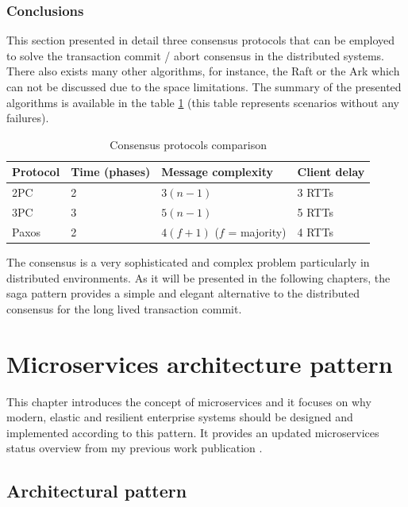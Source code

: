 \documentclass[oneside,
  digital, %
  table,   %
  nolof,     %
  nolot,     %
]{fithesis3}
\begin{document}
\subsection{Conclusions}

This section presented in detail three consensus protocols that can be employed to solve the transaction commit / abort consensus in the distributed systems. There also exists many other algorithms, for instance, the Raft or the Ark which can not be discussed due to the space limitations. The summary of the presented algorithms is available in the table \ref{tab:consensus-protocols-comparison} (this table represents scenarios without any failures).

\begin{table}
    \begin{tabularx}{\textwidth}{lllX}
        \toprule
        Protocol & Time (phases) & Message complexity & Client delay \\
        \midrule
        2PC & 2 & $3(n - 1)$ & 3 RTTs \\
        3PC & 3 & $5(n - 1)$ & 5 RTTs \\
        Paxos & 2 & $4(f + 1)$ ($f$ = majority) & 4 RTTs \\
        \bottomrule
    \end{tabularx}
    \caption{Consensus protocols comparison}
    \label{tab:consensus-protocols-comparison}
\end{table}

The consensus is a very sophisticated and complex problem particularly in distributed environments. As it will be presented in the following chapters, the saga pattern \cite{sagas_publ} provides a simple and elegant alternative to the distributed consensus for the long lived transaction commit.



\clearpage
\chapter{Microservices architecture pattern}

This chapter introduces the concept of microservices and it focuses on why modern, elastic and resilient enterprise systems should be designed and implemented according to this pattern. It provides an updated microservices status overview from my previous work publication \cite{bachelor_thesis}.

\section{Architectural pattern}
\end{document}
